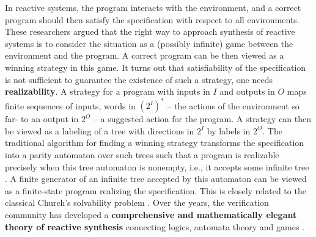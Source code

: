 In reactive
systems, the program interacts with the environment, and a correct
program should then satisfy the specification with respect to all
environments. These researchers argued that the right way to approach
synthesis of reactive systems is to consider the situation as a
(possibly infinite) game between the environment and the program. A
correct program can be then viewed as a winning strategy in this
game.
It turns out that satisfiability of the specification is not
sufficient to guarantee the existence of such a strategy, one needs
\textbf{realizability}. A strategy for a program with inputs in $I$
and outputs in $O$ maps finite sequences of inputs, words in $(2^I)^*$
– the actions of the environment so far- to an output in $2^O$ – a
suggested action for the program. A strategy can then be viewed as a
labeling of a tree with directions in $2^I$ by labels in $2^O$. The
traditional algorithm for finding a winning strategy transforms the
specification into a parity automaton over such trees such that a
program is realizable precisely when this tree automaton is nonempty,
i.e., it accepts some infinite tree \cite{PnRo89}. A finite generator
of an infinite tree accepted by this automaton can be viewed as a
finite-state program realizing the specification. This is closely
related to the classical Church's solvability problem
\cite{Chu63}. Over the years, the verification community has developed
a \textbf{comprehensive and mathematically elegant theory of reactive
  synthesis} connecting logics, automata theory and games \cite{Vard95,KuVa97,KupfermanV05,KupfermanPV06,Vardi08,RyanTacas05,ChatterjeeH07,BloemJPPS12,BohyBFJR12,FinkbeinerS13,LustigV13,FogartyKVW15,DGenestPS15,FearnleyPS15,BloemCJK15,AlurMT16,EsparzaKRS17,BrenguierRS17,HunterPR17}.

